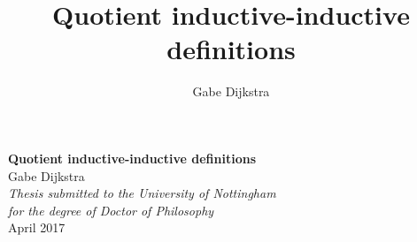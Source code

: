 

\title{Quotient inductive-inductive definitions}
\author{Gabe Dijkstra}



\frontmatter

\begin{titlepage}

\begin{center}

{\huge \bfseries Quotient inductive-inductive definitions}\\[6cm]

 \large {Gabe Dijkstra}
\\[3cm]

 
\large \textit{Thesis submitted to the University of Nottingham\\  for the degree of Doctor of Philosophy}\\[4cm] %


 
{\large April 2017}\\[4cm]
 
\vfill
\end{center}

\end{titlepage}




\tableofcontents

\mainmatter










\appendix




\backmatter

\printbibliography


